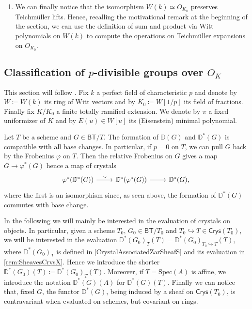 \begin{rem}[]
\begin{enumerate}
\item We can finally notice that the isomorphism $W(k) \simeq O_{K_0}$ preserves
	Teichmüller lifts. Hence, recalling the motivational remark at the beginning
	of the section, we can use the definition of sum and product via
	Witt polynomials on $W(k)$ to compute the operations on
	Teichmüller expansions on $O_{K_0}$.
\end{enumerate}
\end{rem}



\subsection{Classification of \texorpdfstring{$p$}{p}-divisible groups
	over \texorpdfstring{$O_{ K }$}{the ring of integers of K}}
This section will follow \cite[Appendix A]{Kisin}.
Fix $k$ a perfect field of characteristic $p$ and denote by
$W \coloneqq W(k)$ its ring of Witt vectors and by $K_0 \coloneqq W[1/p]$
its field of fractions.
Finally fix $K/K_0$ a finite totally ramified extension.
We denote by $\pi$ a fixed uniformizer of $K$ and by $E(u) \in W[u]$
its (Eisenstein) minimal polynomial.


\begin{rem}[]
	Let $T$ be a scheme and $G \in \mathsf{BT}/T$.
	The formation of $\mathbb{D}(G)$ and $\mathbb{D}^*(G)$ is compatible with all base changes.
	In particular, if $p = 0$ on $T$, we can pull $G$ back by the Frobenius $\varphi$ on $T$.
	Then the relative Frobenius on $G$ gives a map $G \to \varphi^*(G)$
	hence a map of crystals
	\begin{equation*}
	\begin{tikzcd}
		\varphi^* (\mathbb{D}^*(G)) \arrow[r, "\sim", rightarrow] &
		\mathbb{D}^*(\varphi^*(G)) \arrow[r, "", rightarrow] &
		\mathbb{D}^*(G)
	,\end{tikzcd}
	\end{equation*}
	where the first is an isomorphism since, as seen above, the formation of
	$\mathbb{D}^*(G)$ commutes with base change.
\end{rem}


\begin{ntt}[]
	In the following we will mainly be interested in the evaluation of
	crystals on objects.
	In particular, given a scheme $T_0$, $G_0 \in \mathsf{BT}/T_0$ and 
	$T_0 \hookrightarrow T \in \mathsf{Crys}(T_0)$, we will be interested in the
	evaluation $\mathbb{D}^*(G_0)_{T}(T) = \mathbb{D}^*(G_0)_{T_0 \hookrightarrow T}(T)$,
	where $\mathbb{D}^*(G_0)_T$ is defined in \cref{CrystalAssociatedZarSheafS}
	and its evaluation in \cref{rem:SheavesCrysX}.
	Hence we introduce the shorter
	$\mathbb{D}^*(G_0)(T) \coloneqq \mathbb{D}^*(G_0)_T(T)$.
	Moreover, if $T = \mathrm{Spec}(A)$ is affine, we introduce the notation
	$\mathbb{D}^*(G)(A)$ for $\mathbb{D}^*(G)(T)$.
	Finally we can notice that, fixed $G$, the functor $\mathbb{D}^*(G)$,
	being induced by a sheaf on $\mathsf{Crys}(T_0)$,
	is contravariant when evaluated on schemes, but covariant on rings.
\end{ntt}


